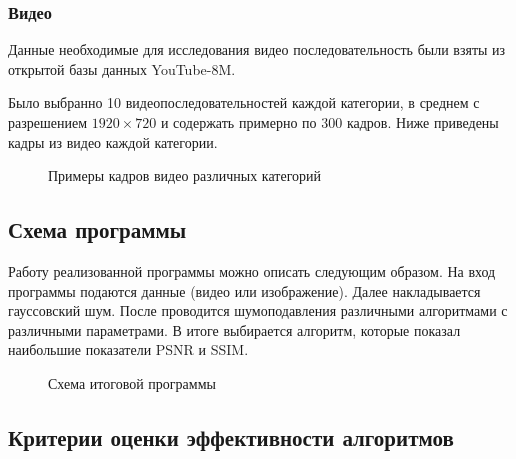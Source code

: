\subsubsection{Видео}
Данные необходимые для исследования видео последовательность были взяты из открытой базы данных  YouTube-8M\cite{youtube8m}.


Было выбранно 10 видеопоследовательностей каждой категории, в среднем с разрешением $1920 \times 720$ и содержать примерно по $300$ кадров. Ниже приведены кадры из видео каждой категории.
\begin{figure}[H]
	\begin{minipage}[H]{0.49\linewidth}
	\end{minipage}
	\begin{minipage}[H]{0.49\linewidth}
	\end{minipage}
	\begin{center}
		\begin{minipage}[H]{0.49\linewidth}
		\end{minipage}
	\end{center}
	\caption{Примеры кадров видео различных категорий}
\end{figure}
\subsection{Схема программы}
Работу реализованной программы можно описать следующим образом. На вход программы подаются данные (видео или изображение). Далее накладывается гауссовский шум. После проводится шумоподавления различными алгоритмами с различными параметрами. В итоге выбирается алгоритм, которые показал наибольшие показатели PSNR и SSIM. 
\begin{figure}[H]
	\caption{Схема итоговой программы}
\end{figure}
\subsection{Критерии оценки эффективности алгоритмов}
